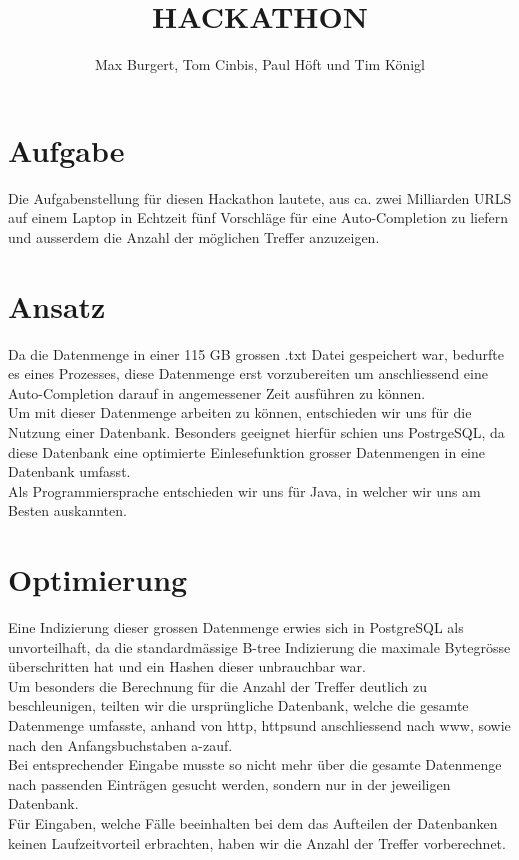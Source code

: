 \documentclass[10pt]{article} %
\title{\textbf{HACKATHON}}
\author{Max Burgert, Tom Cinbis, Paul Höft und Tim Königl}
\begin{document}
\maketitle

\section{Aufgabe}
Die Aufgabenstellung für diesen Hackathon lautete, aus ca. zwei Milliarden URLS auf einem Laptop in Echtzeit fünf Vorschläge für eine Auto-Completion zu liefern und ausserdem die Anzahl der möglichen Treffer anzuzeigen. 

\section{Ansatz}
Da die Datenmenge in einer 115 GB grossen .txt Datei gespeichert war, bedurfte es eines Prozesses, diese Datenmenge erst vorzubereiten um anschliessend eine Auto-Completion darauf in angemessener Zeit ausführen zu können.\\
Um mit dieser Datenmenge arbeiten zu können, entschieden wir uns für die Nutzung einer Datenbank. Besonders geeignet hierfür schien uns PostrgeSQL, da diese Datenbank eine optimierte Einlesefunktion grosser Datenmengen in eine Datenbank umfasst.\\
Als Programmiersprache entschieden wir uns für Java, in welcher wir uns am Besten auskannten.

\section{Optimierung}
Eine Indizierung dieser grossen Datenmenge erwies sich in PostgreSQL als unvorteilhaft, da die standardmässige B-tree Indizierung die maximale Bytegrösse überschritten hat und ein Hashen dieser unbrauchbar war.\\
Um besonders die Berechnung für die Anzahl der Treffer deutlich zu beschleunigen, teilten wir die ursprüngliche Datenbank, welche die gesamte Datenmenge umfasste, anhand von \glqq http\grqq, \glqq https\grqq und anschliessend nach \glqq www\grqq, sowie nach den Anfangsbuchstaben \glqq a-z\grqq  auf.\\
Bei entsprechender Eingabe musste so nicht mehr über die gesamte Datenmenge nach passenden Einträgen gesucht werden, sondern nur in der jeweiligen Datenbank.\\
Für Eingaben, welche Fälle beeinhalten bei dem das Aufteilen der Datenbanken keinen Laufzeitvorteil erbrachten, haben wir die Anzahl der Treffer vorberechnet.
\end{document}
